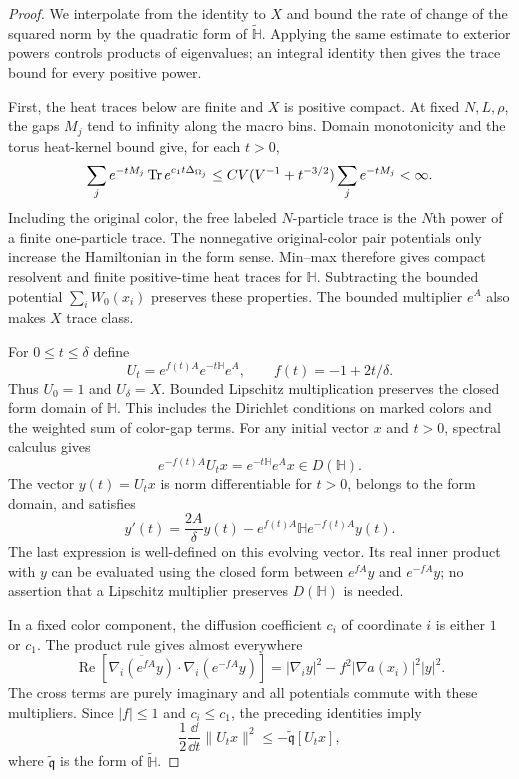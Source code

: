 \begin{proof}
We interpolate from the identity to $X$ and bound the rate of change
of the squared norm by the quadratic form of $\widetilde{\mathbb H}$.
Applying the same estimate to exterior powers controls products of
eigenvalues; an integral identity then gives the trace bound for every
positive power.

First, the heat traces below are finite and $X$ is positive compact.
At fixed $N,L,\rho$, the gaps
$M_j$ tend to infinity along the macro bins.  Domain monotonicity
and the torus heat-kernel bound give, for each $t>0$,
\[
 \sum_j e^{-tM_j}\operatorname{Tr} e^{c_1t\Delta_{\Omega_j}}
 \le C V(V^{-1}+t^{-3/2})\sum_j e^{-tM_j}<\infty.
\]
Including the original color, the free labeled $N$-particle trace
is the $N$th power of a finite one-particle trace.  The nonnegative
original-color pair potentials only increase the Hamiltonian in
the form sense.  Min--max therefore gives compact resolvent and
finite positive-time heat traces for $\mathbb H$.  Subtracting
the bounded potential $\sum_iW_0(x_i)$ preserves these properties.
The bounded multiplier $e^A$ also makes $X$ trace class.

For $0\le t\le\delta$ define
\[
 U_t=e^{f(t)A}e^{-t\mathbb H}e^A,
 \qquad f(t)=-1+2t/\delta.
\]
Thus $U_0=1$ and $U_\delta=X$.  Bounded Lipschitz multiplication
preserves the closed form domain of $\mathbb H$.  This includes
the Dirichlet conditions on marked colors and the weighted
sum of color-gap terms.  For any initial vector $x$ and $t>0$,
spectral calculus gives
\[
 e^{-f(t)A}U_tx=e^{-t\mathbb H}e^Ax\in D(\mathbb H).
\]
The vector $y(t)=U_tx$ is norm differentiable for $t>0$, belongs
to the form domain, and satisfies
\[
 y'(t)=\frac{2A}{\delta}y(t)
             -e^{f(t)A}\mathbb H e^{-f(t)A}y(t).
\]
The last expression is well-defined on this evolving vector.
Its real inner product with $y$ can be evaluated using the
closed form between $e^{fA}y$ and $e^{-fA}y$; no assertion that a
Lipschitz multiplier preserves $D(\mathbb H)$ is needed.

In a fixed color component, the diffusion coefficient $c_i$ of
coordinate $i$ is either $1$ or $c_1$.  The product rule gives
almost everywhere
\[
 \operatorname{Re}\left[
  \overline{\nabla_i(e^{fA}y)}\cdot\nabla_i(e^{-fA}y)\right]
 =|\nabla_i y|^2-f^2|\nabla a(x_i)|^2|y|^2.
\]
The cross terms are purely imaginary and all potentials commute
with these multipliers.  Since $|f|\le1$ and $c_i\le c_1$, the
preceding identities imply
\[
 \frac12\frac{\dd}{\dd t}\|U_tx\|^2
 \le-\widetilde{\mathfrak q}[U_tx],
\]
where $\widetilde{\mathfrak q}$ is the form of
$\widetilde{\mathbb H}$.


\end{proof}
